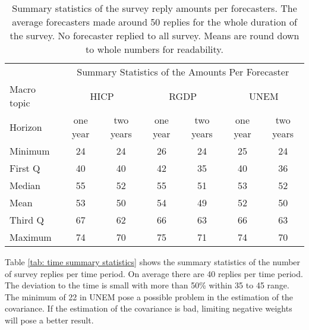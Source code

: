 \documentclass[11pt]{article}
\begin{document}
\begin{table}[!h]
	\centering
	\caption{Summary statistics of the survey reply amounts per forecasters. The average forecasters made around 50 replies for the whole duration of the survey. No forecaster replied to all survey. Means are round down to whole numbers for readability.}
	\label{tab: forecaster summary statistics}
	\begin{tabular}{lcccccc}%
		\hline
		&\multicolumn{6}{c}{Summary Statistics of the Amounts Per Forecaster}\\
		\cmidrule(lr){2-7}
		Macro topic & \multicolumn{2}{c}{HICP} & \multicolumn{2}{c}{RGDP} & \multicolumn{2}{c}{UNEM} \\
		\cmidrule(lr){2-3} \cmidrule(lr){4-5}\cmidrule(lr){6-7}
		Horizon     & one year & two years & one year & two years & one year & two years \\ 
		\hline
		Minimum & 24    & 24    & 26    & 24    & 25    & 24    \\
		First Q & 40    & 40    & 42    & 35    & 40    & 36    \\
		Median  & 55    & 52    & 55    & 51    & 53    & 52    \\
		Mean    & 53    & 50    & 54    & 49    & 52    & 50    \\
		Third Q & 67    & 62    & 66    & 63    & 66    & 63    \\
		Maximum & 74    & 70    & 75    & 71    & 74    & 70      \\ 
		\hline
	\end{tabular}
\end{table}

Table \ref{tab: time summary statistics} shows the summary statistics of the number of survey replies per time period. On average there are 40 replies per time period. The deviation to the time is small with more than 50\% within 35 to 45 range. The minimum of 22 in UNEM pose a possible problem in the estimation of the covariance. If the estimation of the covariance is bad, limiting negative weights will pose a better result.
\end{document}
